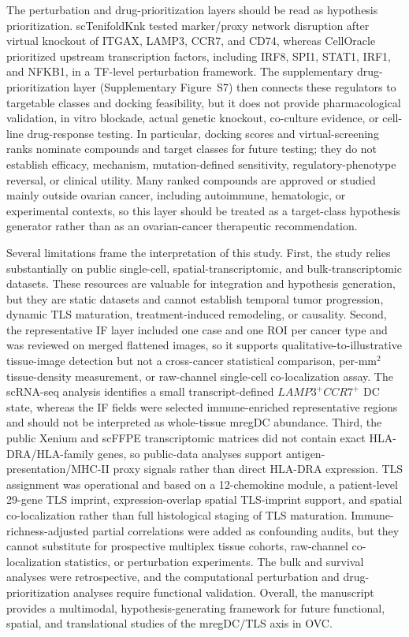 \documentclass[cancers,article,submit,pdftex,moreauthors]{Definitions/mdpi}
\begin{document}
The perturbation and drug-prioritization layers should be read as hypothesis prioritization. scTenifoldKnk tested marker/proxy network disruption after virtual knockout of ITGAX, LAMP3, CCR7, and CD74, whereas CellOracle prioritized upstream transcription factors, including IRF8, SPI1, STAT1, IRF1, and NFKB1, in a TF-level perturbation framework. The supplementary drug-prioritization layer (Supplementary Figure~S7) then connects these regulators to targetable classes and docking feasibility, but it does not provide pharmacological validation, in vitro blockade, actual genetic knockout, co-culture evidence, or cell-line drug-response testing. In particular, docking scores and virtual-screening ranks nominate compounds and target classes for future testing; they do not establish efficacy, mechanism, mutation-defined sensitivity, regulatory-phenotype reversal, or clinical utility. Many ranked compounds are approved or studied mainly outside ovarian cancer, including autoimmune, hematologic, or experimental contexts, so this layer should be treated as a target-class hypothesis generator rather than as an ovarian-cancer therapeutic recommendation.

Several limitations frame the interpretation of this study. First, the study relies substantially on public single-cell, spatial-transcriptomic, and bulk-transcriptomic datasets. These resources are valuable for integration and hypothesis generation, but they are static datasets and cannot establish temporal tumor progression, dynamic TLS maturation, treatment-induced remodeling, or causality. Second, the representative IF layer included one case and one ROI per cancer type and was reviewed on merged flattened images, so it supports qualitative-to-illustrative tissue-image detection but not a cross-cancer statistical comparison, per-mm$^{2}$ tissue-density measurement, or raw-channel single-cell co-localization assay. The scRNA-seq analysis identifies a small transcript-defined $LAMP3^{+}CCR7^{+}$ DC state, whereas the IF fields were selected immune-enriched representative regions and should not be interpreted as whole-tissue mregDC abundance. Third, the public Xenium and scFFPE transcriptomic matrices did not contain exact HLA-DRA/HLA-family genes, so public-data analyses support antigen-presentation/MHC-II proxy signals rather than direct HLA-DRA expression. TLS assignment was operational and based on a 12-chemokine module, a patient-level 29-gene TLS imprint, expression-overlap spatial TLS-imprint support, and spatial co-localization rather than full histological staging of TLS maturation. Immune-richness-adjusted partial correlations were added as confounding audits, but they cannot substitute for prospective multiplex tissue cohorts, raw-channel co-localization statistics, or perturbation experiments. The bulk and survival analyses were retrospective, and the computational perturbation and drug-prioritization analyses require functional validation. Overall, the manuscript provides a multimodal, hypothesis-generating framework for future functional, spatial, and translational studies of the mregDC/TLS axis in OVC.
\end{document}
